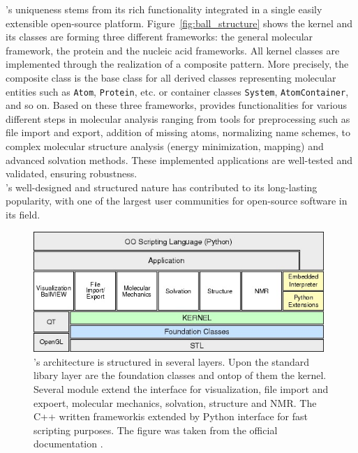 \ball's uniqueness stems from its rich functionality integrated in a single easily extensible open-source platform. Figure~\ref{fig:ball_structure} shows the kernel and its classes are forming three different frameworks: the general molecular framework, the protein and the nucleic acid frameworks. All kernel classes are implemented through the realization of a composite pattern. More precisely, the composite class is the base class for all derived classes representing molecular entities such as \texttt{Atom}, \texttt{Protein}, etc. or container classes \texttt{System}, \texttt{AtomContainer}, and so on. 
Based on these three frameworks, \ball provides functionalities for various different steps in molecular analysis ranging from tools for preprocessing such as file import and export, addition of missing atoms, normalizing name schemes, to complex molecular structure analysis (energy minimization, mapping) and advanced solvation methods. These implemented applications are well-tested and validated, ensuring robustness.  \\
\ball's well-designed and structured nature has contributed to its long-lasting popularity, with one of the largest user communities for open-source software in its field.



\begin{figure}[t]
	\centerline{\includegraphics[width=11cm]{gfx/BALL-architecture.jpeg}}
	\caption{\ball's architecture is structured in several layers. Upon the standard libary layer are the foundation classes and ontop of them the kernel. Several module extend the interface for visualization, file import and expoert, molecular mechanics, solvation, structure and NMR. The C++ written frameworkis extended by Python interface for fast scripting purposes. The figure was taken from the official \ball documentation \cite{ball_tutorial}.}
	\label{fig:ball_architecture}
\end{figure}



